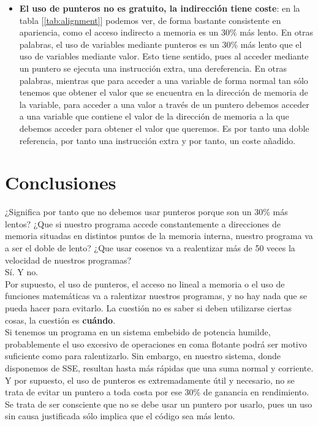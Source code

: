\begin{itemize}
	\item \textbf{El uso de punteros no es gratuito, la indirección tiene coste}: en la tabla [\ref{tab:alignment}] podemos ver, de forma bastante consistente en apariencia, como el acceso indirecto a memoria es un 30\% más lento. En otras palabras, el uso de variables mediante punteros es un 30\% más lento que el uso de variables mediante valor. Esto tiene sentido, pues al acceder mediante un puntero se ejecuta una instrucción extra, una dereferencia. En otras palabras, mientras que para acceder a una variable de forma normal tan sólo tenemos que obtener el valor que se encuentra en la dirección de memoria de la variable, para acceder a una valor a través de un puntero debemos acceder a una variable que contiene el valor de la dirección de memoria a la que debemos acceder para obtener el valor que queremos. Es por tanto una doble referencia, por tanto una instrucción extra y por tanto, un coste añadido.
\end{itemize}

\section{Conclusiones}

¿Significa por tanto que no debemos usar punteros porque son un 30\% más lentos? ¿Que si nuestro programa accede constantemente a direcciones de memoria situadas en distintos puntos de la memoria interna, nuestro programa va a ser el doble de lento? ¿Que usar cosenos va a realentizar más de 50 veces la velocidad de nuestros programas?\\

Sí. Y no.\\

Por supuesto, el uso de punteros, el acceso no lineal a memoria o el uso de funciones matemáticas va a ralentizar nuestros programas, y no hay nada que se pueda hacer para evitarlo. La cuestión no es saber si deben utilizarse ciertas cosas, la cuestión es \textbf{cuándo}.\\

Si tenemos un programa en un sistema embebido de potencia humilde, probablemente el uso excesivo de operaciones en coma flotante podrá ser motivo suficiente como para ralentizarlo. Sin embargo, en nuestro sistema, donde disponemos de SSE, resultan hasta más rápidas que una suma normal y corriente.\\

Y por supuesto, el uso de punteros es extremadamente útil y necesario, no se trata de evitar un puntero a toda costa por ese 30\% de ganancia en rendimiento. Se trata de ser consciente que no se debe usar un puntero por usarlo, pues un uso sin causa justificada sólo implica que el código sea más lento.\\

